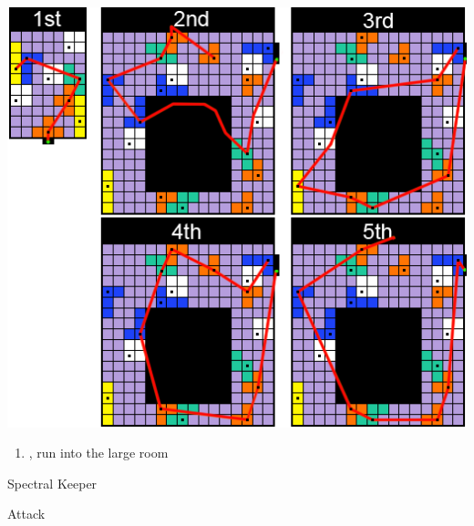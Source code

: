 \includegraphics{graphics/Zanarkand_Trials}
\begin{enumerate}[resume]
	\item \cs, run into the large room
\end{enumerate}
\begin{battle}[52000]{Spectral Keeper}
	\begin{itemize}
		\summon{\bahamut}
		\bahamutf Attack
	\end{itemize}
\end{battle}
\vfill
